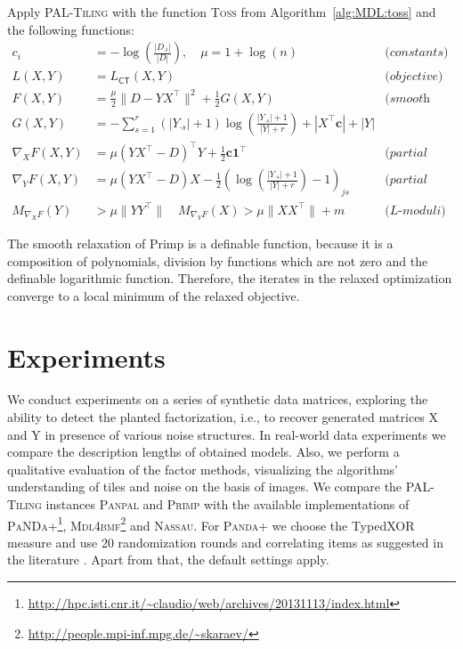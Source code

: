 \begin{algSpec}[Primp]\label{algSpec:Primp}
Apply \textsc{PAL-Tiling} with the function \textsc{Toss} from Algorithm~\ref{alg:MDL:toss} and the following functions:
\begin{align*}
    c_i&=-\log\left(\frac{|D_{\cdot i}|}{|D|}\right),\quad \mu= 1+\log(n) &\textit{(constants)}\\
    L(X,Y)&= L_{\mathsf{CT}}(X,Y) & \textit{(objective)}\\
    F(X,Y)&=\frac{\mu}{2}\|D-YX^\top \|^2+ \frac{1}{2}G(X,Y) & \textit{(smooth part)}\\
    G(X,Y)&=-\sum_{s=1}^r(|Y_{\cdot s}|+1)\log\left(\frac{|Y_{\cdot s}|+1}{|Y|+r}\right) +|X^\top \mathbf{c}| +|Y|&\\
    \nabla_XF(X,Y)&=\mu(YX^\top -D)^\top Y+\frac{1}{2}\mathbf{c}\mathbf{1}^\top  & \textit{(partial gradient X)}\\
    \nabla_YF(X,Y)&=\mu(YX^\top -D)X-\frac{1}{2}\left(\log\left(\frac{|Y_{\cdot s}|+1}{|Y|+r}\right)-1\right)_{js}& \textit{(partial gradient Y)}\\
    M_{\nabla_X F}(Y)&>\mu\|YY^\top \|\quad M_{\nabla_Y F}(X)>\mu\|XX^\top \|+m & \textit{(L-moduli)}
\end{align*}
\end{algSpec}
The smooth relaxation of Primp is a definable function, because it is a composition of polynomials, division by functions which are not zero and the definable logarithmic function. Therefore, the iterates in the relaxed optimization converge to a local minimum of the relaxed objective.
\section{Experiments}\label{sec:MDL:Experiments}
We conduct experiments on a series of synthetic data matrices, exploring the ability to detect the planted factorization, i.e., to recover generated matrices X and Y in presence of various noise structures. In real-world data experiments we compare the description lengths of obtained models. Also, we perform a qualitative evaluation of the factor methods, visualizing the algorithms' understanding of tiles and noise on the basis of images. We compare the \textsc{PAL-Tiling} instances \textsc{Panpal} and \textsc{Primp} with the available implementations of 
\textsc{PaNDa+}\footnote{\url{http://hpc.isti.cnr.it/~claudio/web/archives/20131113/index.html}}, \textsc{Mdl4bmf}\footnote{\label{note1}\url{http://people.mpi-inf.mpg.de/~skaraev/}} and \textsc{Nassau}. For \textsc{Panda+} we choose the TypedXOR measure and use 20 randomization rounds and correlating items as suggested in the literature \citep{lucchese2014unifying}. Apart from that, the default settings apply. 

